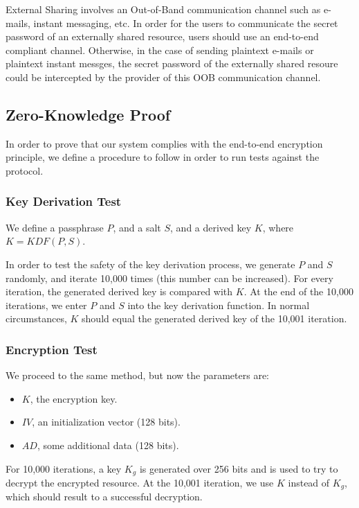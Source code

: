 \documentclass[a4paper,9pt,twoside]{article}
\begin{document}
External Sharing involves an Out-of-Band communication channel such as e-mails, 
instant messaging, etc. In order for the users to communicate the secret password of an 
externally shared resource, users should use an end-to-end compliant channel. Otherwise, 
in the case of sending plaintext e-mails or plaintext instant messges, the secret password of the externally shared resoure 
could be intercepted by the provider of this OOB communication channel.

\subsection{Zero-Knowledge Proof}

In order to prove that our system complies with the end-to-end encryption principle, 
we define a procedure to follow in order to run tests against the protocol.

\subsubsection{Key Derivation Test}

We define a passphrase  $P$, and a salt $S$, and a derived key $K$, where 
$K=KDF(P, S)$.

    In order to test the safety of the key derivation process, we generate $P$ and $S$ randomly, 
and iterate 10,000 times (this number can be increased). For every iteration, the generated derived key 
is compared with $K$. At the end of the 10,000 iterations, we enter $P$ and $S$ into the key derivation 
function. In normal circumstances, $K$ should equal the generated derived key of the 10,001 iteration.

\subsubsection{Encryption Test}

We proceed to the same method, but now the parameters are:

\begin{itemize}
\itemsep0em
\item $K$, the encryption key.
\item $IV$, an initialization vector (128 bits).
\item $AD$, some additional data (128 bits).
\end{itemize}

    For 10,000 iterations, a key $K_g$ is generated over 256 bits and is used to try to decrypt 
the encrypted resource. At the 10,001 iteration, we use $K$ instead of $K_g$, which should result 
to a successful decryption.
\end{document}
